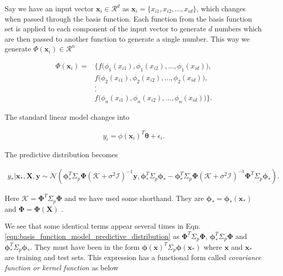 \documentclass[english]{tktltiki}
\begin{document}
Say we have an input vector $\mathbf{x}_i \in \mathcal{R}^d$ as $\mathbf{x}_i = \{x_{i1}, x_{i2}, ..., x_{id}\}$, which changes when passed through the basis function. Each function from the basis function set is applied to each component of the input vector to generate $d$ numbers which are then passed to another function to generate a single number. This way we generate $\Phi(\mathbf{x}_i) \in \mathcal{R}^n$  

\begin{align}
\label{eqn:basis_function}
	\Phi(\mathbf{x}_i) =  &\Bigg\{f\bigg(\phi_1(x_{i1}), \phi_1(x_{i2}), ..., \phi_1(x_{id})\bigg), \nonumber \\ 
	 &f\bigg(\phi_2(x_{i1}), \phi_2(x_{i2}), ..., \phi_2(x_{id})\bigg), \nonumber \\ 
	 &. \nonumber \\
	 &. \nonumber \\
	 &f\bigg(\phi_n(x_{i1}), \phi_n(x_{i2}), ..., \phi_n(x_{id})\bigg)\Bigg\}.
\end{align}

The standard linear model changes into

\begin{equation}
\label{eqn:basis_function_model}
\begin{split}
	y_i = \phi(\mathbf{x}_i)^T \boldsymbol\theta + \epsilon_i.
\end{split}
\end{equation}

The predictive distribution becomes

\begin{equation}
\label{eqn:basis_function_model_predictive_distribution}
\begin{split}
	y_* | \mathbf{x}_*, \mathbf{X}, \mathbf{y} \sim \mathcal{N}(\boldsymbol\phi_*^T \Sigma_p \boldsymbol\Phi(\mathcal{K} + \sigma^2 \mathcal{I})^{-1} \mathbf{y}, \boldsymbol\phi_*^T \Sigma_p \boldsymbol\phi_* - \boldsymbol\phi_*^T \Sigma_p \boldsymbol\Phi(\mathcal{K} + \sigma^2 \mathcal{I})^{-1} \boldsymbol\Phi^T \Sigma_p \boldsymbol\phi_*).
\end{split}
\end{equation}

Here $\mathcal{K} = \boldsymbol\Phi^T \Sigma_p \boldsymbol\Phi$ and we have used some shorthand. They are $\boldsymbol\phi_* = \boldsymbol\phi_*(\mathbf{x}_*)$ and $\boldsymbol\Phi = \boldsymbol\Phi(\mathbf{X})$ \cite{gaussian_process_for_machine_learning}.

We see that some identical terms appear several times in Eqn. \ref{eqn:basis_function_model_predictive_distribution} as $\boldsymbol\Phi^T \Sigma_p \boldsymbol\Phi$, $\boldsymbol\phi_*^T \Sigma_p \boldsymbol\Phi$ and $\boldsymbol\phi_*^T \Sigma_p \boldsymbol\phi_*$. They must have been in the form $\boldsymbol\phi(\mathbf{x})^T \Sigma_p \boldsymbol\phi(\mathbf{x_*})$ where $\mathbf{x}$ and $\mathbf{x_*}$ are training and test sets. This expression has a functional form called \textit{covariance function or kernel function} as below
\end{document}
